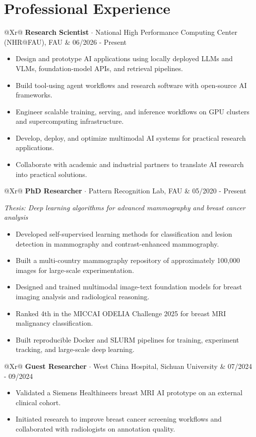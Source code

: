 \documentclass[10pt,a4paper]{article}
\makeatletter
\newcommand{\role}[4]{%
  \begin{tabularx}{\textwidth}{@{}Xr@{}}
    \textbf{#1} $\cdot$ \textcolor{accent}{#2} & \textcolor{muted}{\footnotesize #3}\\
    \multicolumn{2}{@{}l@{}}{\textcolor{muted}{\footnotesize #4}}
  \end{tabularx}\vspace{-1pt}}
\makeatother
\begin{document}
\section{Professional Experience}
\role{Research Scientist}{National High Performance Computing Center (NHR@FAU), FAU}{06/2026 - Present}{Erlangen, Germany}
\begin{itemize}
  \item Design and prototype AI applications using locally deployed LLMs and VLMs, foundation-model APIs, and retrieval pipelines.
  \item Build tool-using agent workflows and research software with open-source AI frameworks.
  \item Engineer scalable training, serving, and inference workflows on GPU clusters and supercomputing infrastructure.
  \item Develop, deploy, and optimize multimodal AI systems for practical research applications.
  \item Collaborate with academic and industrial partners to translate AI research into practical solutions.
\end{itemize}

\role{PhD Researcher}{Pattern Recognition Lab, FAU}{05/2020 - Present}{Erlangen, Germany}
\textit{Thesis: Deep learning algorithms for advanced mammography and breast cancer analysis}
\begin{itemize}
  \item Developed self-supervised learning methods for classification and lesion detection in mammography and contrast-enhanced mammography.
  \item Built a multi-country mammography repository of approximately 100,000 images for large-scale experimentation.
  \item Designed and trained multimodal image-text foundation models for breast imaging analysis and radiological reasoning.
  \item Ranked 4th in the MICCAI ODELIA Challenge 2025 for breast MRI malignancy classification.
  \item Built reproducible Docker and SLURM pipelines for training, experiment tracking, and large-scale deep learning.
\end{itemize}

\role{Guest Researcher}{West China Hospital, Sichuan University}{07/2024 - 09/2024}{Chengdu, China}
\begin{itemize}
  \item Validated a Siemens Healthineers breast MRI AI prototype on an external clinical cohort.
  \item Initiated research to improve breast cancer screening workflows and collaborated with radiologists on annotation quality.
\end{itemize}
\end{document}
